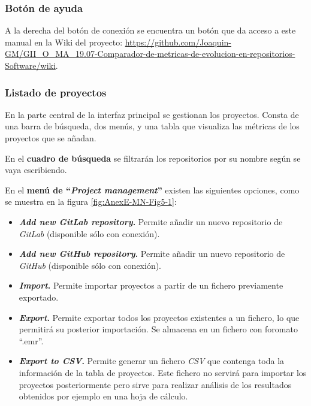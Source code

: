 \newpage
\subsubsection{Botón de ayuda}
A la derecha del botón de conexión se encuentra un botón que da acceso a este manual en la Wiki del proyecto: \url{https://github.com/Joaquin-GM/GII_O_MA_19.07-Comparador-de-metricas-de-evolucion-en-repositorios-Software/wiki}.

\subsubsection{Listado de proyectos}
En la parte central de la interfaz principal se gestionan los proyectos. Consta de una barra de búsqueda, dos menús, y una tabla que visualiza las métricas de los proyectos que se añadan.

En el \textbf{cuadro de búsqueda} se filtrarán los repositorios por su nombre según se vaya escribiendo.

En el \textbf{menú de ``\textit{Project management}''} existen las siguientes opciones, como se muestra en la figura \ref{fig:AnexE-MN-Fig5-1}:
\begin{itemize}
	\item \textbf{\textit{Add new GitLab repository}.} Permite añadir un nuevo repositorio de \textit{GitLab} (disponible sólo con conexión). 
	
	\item \textbf{\textit{Add new GitHub repository}.} Permite añadir un nuevo repositorio de \textit{GitHub} (disponible sólo con conexión). 
	
	\item \textbf{\textit{Import}.} Permite importar proyectos a partir de un fichero previamente exportado.
	
	\item \textbf{\textit{Export}.} Permite exportar todos los proyectos existentes a un fichero, lo que permitirá su posterior importación. Se almacena en un fichero con foromato ``.emr''.
	
	\item \textbf{\textit{Export to CSV}.} Permite generar un fichero \textit{CSV} que contenga toda la información de la tabla de proyectos. Este fichero no servirá para importar los proyectos posteriormente pero sirve para realizar análisis de los resultados obtenidos por ejemplo en una hoja de cálculo.
\end{itemize}

